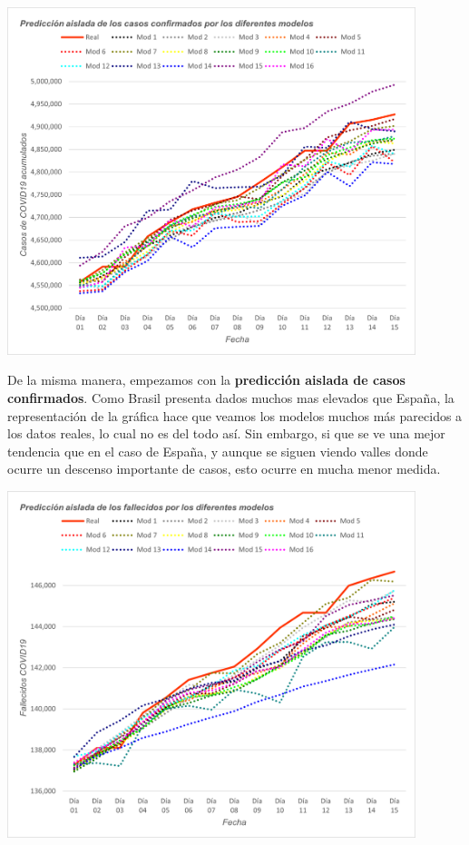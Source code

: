 \documentclass[12pt,a4paper, xcolor=table]{article}
\begin{document}
            \begin{center}
                \centering
                \includegraphics[width=450px]{img/pred_a_conf_BZ.png}
            \end{center}
            
            De la misma manera, empezamos con la \textbf{predicción aislada de casos confirmados}. Como Brasil presenta dados muchos mas elevados que España, la representación de la gráfica hace que veamos los modelos muchos más parecidos a los datos reales, lo cual no es del todo así. Sin embargo, si que se ve una mejor tendencia que en el caso de España, y aunque se siguen viendo valles donde ocurre un descenso importante de casos, esto ocurre en mucha menor medida.
            
            \begin{center}
                \centering
                \includegraphics[width=450px]{img/pred_a_fall_BZ.png}
            \end{center}
                
\end{document}
